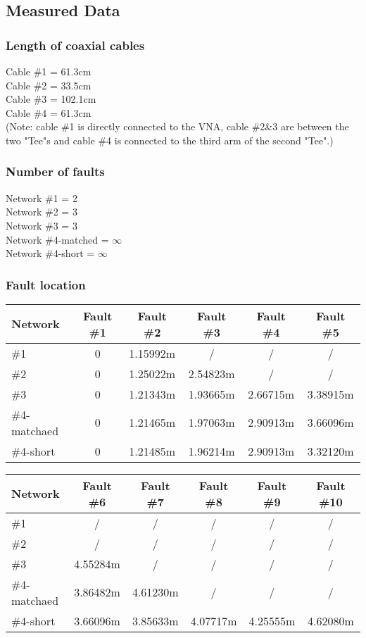 \documentclass[11pt,oneside,a4paper]{report}
\begin{document}
\subsection*{Measured Data}
\subsubsection{Length of coaxial cables}
Cable \#1 = 61.3cm\\
Cable \#2 = 33.5cm\\
Cable \#3 = 102.1cm\\
Cable \#4 = 61.3cm\\
(Note: cable \#1 is directly connected to the VNA, cable \#2\&3 are between the two "Tee"s and cable \#4 is connected to the third arm of the second "Tee".)

\subsubsection*{Number of faults}
Network \#1 = 2\\
Network \#2 = 3\\
Network \#3 = 3\\
Network \#4-matched = \(\infty\)\\
Network \#4-short = \(\infty\)
\subsubsection*{Fault location}
\begin{table}[htbp]
\begin{tabular}{lccccc}
\toprule
Network & Fault \#1 & Fault \#2 & Fault \#3 & Fault \#4 & Fault \#5 \\
\midrule
\#1 & 0 & 1.15992m & / & / & / \\
\#2 & 0 & 1.25022m & 2.54823m & / & / \\
\#3 & 0 & 1.21343m & 1.93665m & 2.66715m & 3.38915m \\
\#4-matchaed & 0 & 1.21465m & 1.97063m & 2.90913m & 3.66096m \\
\#4-short & 0 & 1.21485m & 1.96214m & 2.90913m & 3.32120m \\
\bottomrule
\end{tabular}
\end{table}

\begin{table}[htbp]
\begin{tabular}{lccccc}
\toprule
Network & Fault \#6 & Fault \#7 & Fault \#8 & Fault \#9 & Fault \#10 \\
\midrule
\#1 & / & / & / & / & / \\
\#2 & / & / & / & / & / \\
\#3 & 4.55284m & / & / & / & / \\
\#4-matchaed & 3.86482m & 4.61230m & / & / & / \\
\#4-short & 3.66096m & 3.85633m & 4.07717m & 4.25555m & 4.62080m \\
\bottomrule
\end{tabular}
\end{table}
\end{document}
